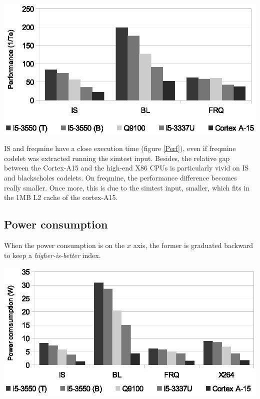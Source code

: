 \documentclass{article}
\newenvironment{Figure}
  {\par\medskip\noindent\center\minipage{0.9\linewidth}}
  {\endminipage\par\bigskip\medskip}
\begin{document}
\begin{multicols}{2}
\begin{Figure}
\centering
\includegraphics[width=\linewidth]{Performance.eps}
\end{Figure}


IS and freqmine have a close execution time (figure \ref{Perf}), even if freqmine codelet was extracted running the simtest input. Besides, the relative gap between the Cortex-A15 and the high-end X86 CPUs is particularly vivid on IS and blackscholes codelets. On freqmine, the performance difference becomes really smaller. Once more, this is due to the simtest input, smaller, which fits in the 1MB L2 cache of the cortex-A15.


\subsection{Power consumption}
When the power consumption is on the $x$ axis, the former is graduated backward to keep a \textit{higher-is-better} index.


\begin{Figure}
\centering
\includegraphics[width=\linewidth]{Power_consumption.eps}
\end{Figure}


\end{multicols}
\end{document}
